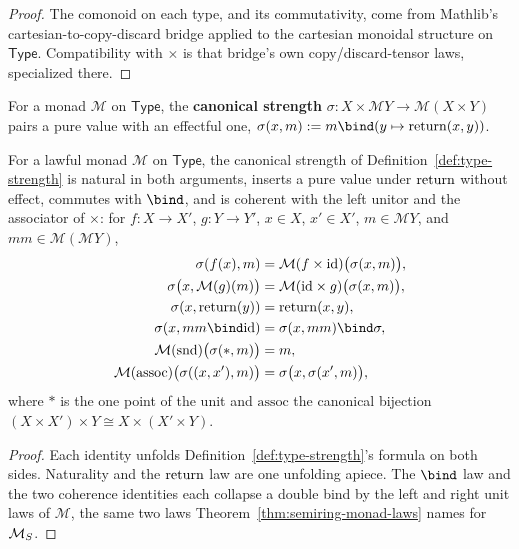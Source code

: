 \begin{proof}
\leanok
The comonoid on each type, and its commutativity, come from
Mathlib's cartesian-to-copy-discard bridge applied to the cartesian
monoidal structure on $\mathsf{Type}$. Compatibility with $\times$ is
that bridge's own copy/discard-tensor laws, specialized there.
\end{proof}

\begin{definition}
\label{def:type-strength}
\leanok
For a monad $\mathcal M$ on $\mathsf{Type}$, the \textbf{canonical
strength} $\sigma \colon X \times \mathcal M Y \to \mathcal M(X \times Y)$
pairs a pure value with an effectful one,
$\sigma(x, m) := m \bind (y \mapsto \Ret(x,y))$.
\end{definition}

\begin{lemma}
\label{lem:type-strength-laws}
\leanok
For a lawful monad $\mathcal M$ on $\mathsf{Type}$, the canonical
strength of Definition~\ref{def:type-strength} is natural in both
arguments, inserts a pure value under $\mathrm{return}$ without effect, commutes
with $\bind$, and is coherent with the left unitor and the associator
of $\times$: for $f \colon X \to X'$, $g \colon Y \to Y'$, $x \in X$,
$x' \in X'$, $m \in \mathcal M Y$, and $mm \in \mathcal M(\mathcal M Y)$,
\begin{align*}
\sigma(f(x), m) &= \mathcal M(f \times \mathrm{id})\bigl(\sigma(x, m)\bigr), \\
\sigma\bigl(x, \mathcal M(g)(m)\bigr) &= \mathcal M(\mathrm{id} \times g)\bigl(\sigma(x, m)\bigr), \\
\sigma(x, \Ret(y)) &= \Ret(x, y), \\
\sigma(x, mm \bind \mathrm{id}) &= \sigma(x, mm) \bind \sigma, \\
\mathcal M(\mathrm{snd})\bigl(\sigma(\ast, m)\bigr) &= m, \\
\mathcal M(\mathrm{assoc})\bigl(\sigma((x,x'), m)\bigr) &= \sigma\bigl(x, \sigma(x', m)\bigr),
\end{align*}
where $\ast$ is the one point of the unit and $\mathrm{assoc}$ the
canonical bijection $(X \times X') \times Y \cong X \times (X' \times Y)$.
\end{lemma}

\begin{proof}
\leanok
Each identity unfolds Definition~\ref{def:type-strength}'s formula on
both sides. Naturality and the $\mathrm{return}$ law are one unfolding apiece.
The $\bind$ law and the two coherence identities each collapse a
double bind by the left and right unit laws of $\mathcal M$, the same
two laws Theorem~\ref{thm:semiring-monad-laws} names for $\mathcal M_{S}$.
\end{proof}

